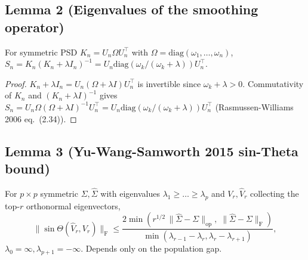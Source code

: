 \subsection*{Lemma 2 (Eigenvalues of the smoothing operator)}

\begin{lemma}\label{lem:smoother-eig}
For symmetric PSD $K_n=U_n\Omega U_n^\top$ with $\Omega=\mathrm{diag}(\omega_1,\dots,\omega_n)$,
$S_n=K_n(K_n+\lambda I_n)^{-1}=U_n\mathrm{diag}(\omega_k/(\omega_k+\lambda))U_n^\top$.
\end{lemma}

\begin{proof}
$K_n+\lambda I_n=U_n(\Omega+\lambda I)U_n^\top$ is invertible since $\omega_k+\lambda>0$.
Commutativity of $K_n$ and $(K_n+\lambda I)^{-1}$ gives
$S_n=U_n\Omega(\Omega+\lambda I)^{-1}U_n^\top=U_n\mathrm{diag}(\omega_k/(\omega_k+\lambda))U_n^\top$
(Rasmussen-Williams 2006 eq.~(2.34)).
\end{proof}

\subsection*{Lemma 3 (Yu-Wang-Samworth 2015 sin-Theta bound)}

\begin{lemma}\label{lem:yws}
For $p\times p$ symmetric $\Sigma,\widehat\Sigma$ with eigenvalues
$\lambda_1\ge\dots\ge\lambda_p$ and $V_r,\widehat V_r$ collecting the top-$r$
orthonormal eigenvectors,
\begin{equation}\label{eq:yws}
\|\sin\Theta(\widehat V_r,V_r)\|_{\mathrm F}
\le\frac{2\min(r^{1/2}\,\|\widehat\Sigma-\Sigma\|_{\mathrm{op}},\;\|\widehat\Sigma-\Sigma\|_{\mathrm F})}
     {\min(\lambda_{r-1}-\lambda_r,\lambda_r-\lambda_{r+1})},
\end{equation}
$\lambda_0=\infty,\lambda_{p+1}=-\infty$. Depends only on the population gap.
\end{lemma}

